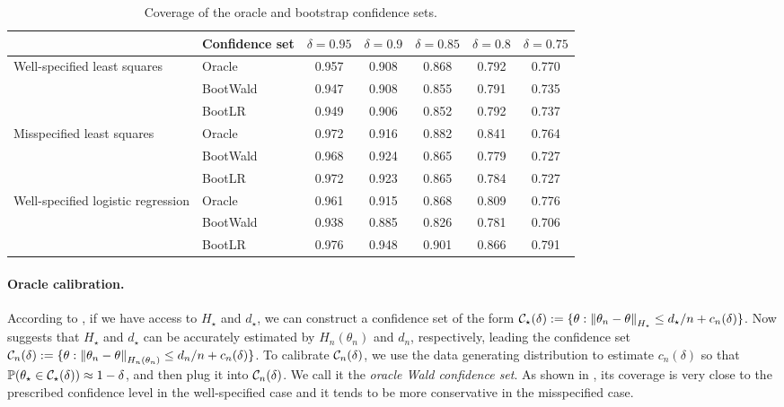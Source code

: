 \begin{table*}[t]
  \caption{Coverage of the oracle and bootstrap confidence sets.}
  \label{tab:bootstrap}
  \centering
  \renewcommand{\arraystretch}{1.2}
  \begin{tabular}{llccccc}
      \addlinespace[0.4em]
      \toprule
      \multicolumn{1}{c}{\textbf{Model}} & \multicolumn{1}{c}{\textbf{Confidence set}} & \multicolumn{1}{c}{$\delta = 0.95$} & \multicolumn{1}{c}{$\delta = 0.9$} & \multicolumn{1}{c}{$\delta = 0.85$} & \multicolumn{1}{c}{$\delta = 0.8$} & \multicolumn{1}{c}{$\delta = 0.75$}  \\
      \midrule
      \multirow{3}{*}{Well-specified least squares} & Oracle & 0.957 & 0.908 & 0.868 & 0.792 & 0.770 \\
      & BootWald & 0.947 & 0.908 & 0.855 & 0.791 & 0.735 \\
      & BootLR & 0.949 & 0.906 & 0.852 & 0.792 & 0.737 \\
      \midrule
      \multirow{3}{*}{Misspecified least squares} & Oracle & 0.972 & 0.916 & 0.882 & 0.841 & 0.764 \\
      & BootWald & 0.968 & 0.924 & 0.865 & 0.779 & 0.727 \\
      & BootLR & 0.972 & 0.923 & 0.865 & 0.784 & 0.727 \\
      \midrule
      \multirow{3}{*}{Well-specified logistic regression} & Oracle & 0.961 & 0.915 & 0.868 & 0.809 & 0.776 \\
      & BootWald & 0.938 & 0.885 & 0.826 & 0.781 & 0.706 \\
      & BootLR & 0.976 & 0.948 & 0.901 & 0.866 & 0.791 \\
      \bottomrule
  \end{tabular}
\end{table*}

\paragraph{Oracle calibration.}
According to , if we have access to $H_\star$ and $d_\star$, we can construct a confidence set of the form $\mathcal{C}_\star(\delta) := \{\theta: \left\lVert \theta_n - \theta \right\rVert_{H_\star} \le d_\star/n + c_n(\delta)\}$.
Now  suggests that $H_\star$ and $d_\star$ can be accurately estimated by $H_n(\theta_n)$ and $d_n$, respectively, leading the confidence set $\mathcal{C}_n(\delta) := \{\theta: \left\lVert \theta_n - \theta \right\rVert_{H_n(\theta_n)} \le d_n/n + c_n(\delta)\}$.
To calibrate $\mathcal{C}_n(\delta)$, we use the data generating distribution to estimate $c_n(\delta)$ so that $\operatorname{\mathbb P}(\theta_\star \in \mathcal{C}_\star(\delta)) \approx 1 - \delta$, and then plug it into $\mathcal{C}_n(\delta)$.
We call it the \emph{oracle Wald confidence set}.
As shown in , its coverage is very close to the prescribed confidence level in the well-specified case and it tends to be more conservative in the misspecified case.

